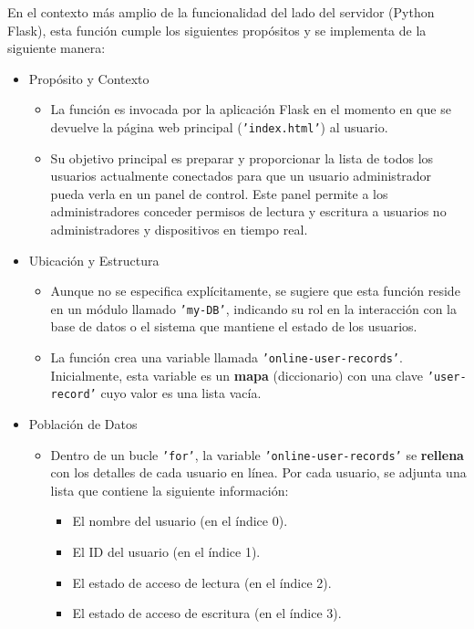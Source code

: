 \documentclass{report}
\begin{document}
En el contexto más amplio de la funcionalidad del lado del servidor (Python Flask), esta función cumple los siguientes propósitos y se implementa de la 
siguiente manera:
\begin{itemize}
    \item Propósito y Contexto
        \begin{itemize}
            \item La función es invocada por la aplicación Flask en el momento en que se devuelve la página web principal (\texttt{'index.html'}) al usuario.
            \item Su objetivo principal es preparar y proporcionar la lista de todos los usuarios actualmente conectados para que un usuario administrador 
            pueda verla en un panel de control. Este panel permite a los administradores conceder permisos de lectura y escritura a usuarios no administradores 
            y dispositivos en tiempo real.
        \end{itemize}

    \item Ubicación y Estructura
        \begin{itemize}
            \item Aunque no se especifica explícitamente, se sugiere que esta función reside en un módulo llamado \texttt{'my-DB'}, indicando su rol 
            en la interacción con la base de datos o el sistema que mantiene el estado de los usuarios.
            \item La función crea una variable llamada \texttt{'online-user-records'}. Inicialmente, esta variable es un \textbf{mapa} (diccionario) con 
            una clave \texttt{'user-record'} cuyo valor es una lista vacía.
        \end{itemize}

    \item Población de Datos
        \begin{itemize}
            \item Dentro de un bucle \texttt{'for'}, la variable \texttt{'online-user-records'} se \textbf{rellena} con los detalles de cada usuario 
            en línea. Por cada usuario, se adjunta una lista que contiene la siguiente información:
                \begin{itemize}
                    \item El nombre del usuario  (en el índice 0).
                    \item El ID del usuario  (en el índice 1).
                    \item El estado de acceso de lectura (en el índice 2).
                    \item El estado de acceso de escritura (en el índice 3).
                \end{itemize} 
        \end{itemize}


\end{itemize}
\end{document}
